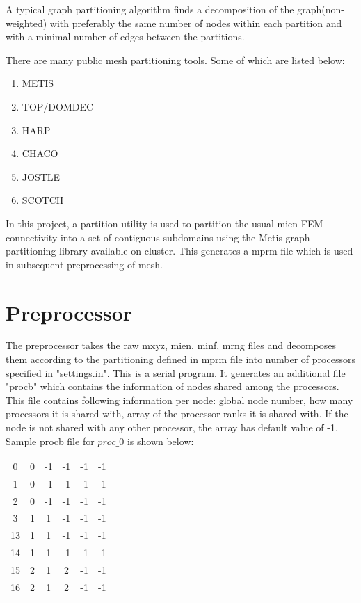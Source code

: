 \documentclass[a4paper, 11pt, oneside]{scrartcl}
\begin{document}
A typical graph partitioning algorithm finds a decomposition of the graph(non-weighted) with preferably the same number of nodes within each partition and with a minimal number of edges between the partitions. 

There are many public mesh partitioning tools. Some of which are listed below:
\begin{enumerate}
\item METIS
\item TOP/DOMDEC
\item HARP
\item CHACO
\item JOSTLE
\item SCOTCH
\end{enumerate}

In this project, a partition utility is used to partition the usual mien FEM connectivity into a set of contiguous subdomains using the Metis graph partitioning library available on cluster. This generates a mprm file which is used in subsequent preprocessing of mesh.

\section{Preprocessor}
The preprocessor takes the raw mxyz, mien, minf, mrng files and decomposes them according to the partitioning defined in mprm file into number of processors specified in "settings.in". This is a serial program. 
It generates an additional file "procb" which contains the information of nodes shared among the processors. This file contains following information per node: global node number, how many processors it is shared with, array of the processor ranks it is shared with. If the node is not shared with any other processor, the array has default value of -1.
Sample procb file for $proc\_0$ is shown below:

\begin{center}

\begin{tabular}{cccccc}

0 & 0 & -1 & -1 & -1 & -1 \\ 

1 & 0 & -1 & -1 & -1 & -1 \\ 

2 & 0 & -1 & -1 & -1 & -1 \\ 

3 & 1 & 1 & -1 & -1 & -1 \\ 

13 & 1 & 1 & -1 & -1 & -1 \\ 

14 & 1 & 1 & -1 & -1 & -1 \\ 
 
15 & 2 & 1 & 2 & -1 & -1 \\ 
 
16 & 2 & 1 & 2 & -1 & -1 \\ 
\end{tabular} 

\end{center}
\end{document}
